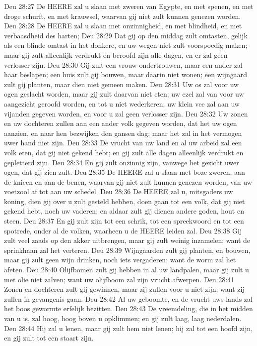 Deu 28:27  De HEERE zal u slaan met zweren van Egypte, en met spenen, en met droge schurft, en met krauwsel, waarvan gij niet zult kunnen genezen worden.
Deu 28:28  De HEERE zal u slaan met onzinnigheid, en met blindheid, en met verbaasdheid des harten;
Deu 28:29  Dat gij op den middag zult omtasten, gelijk als een blinde omtast in het donkere, en uw wegen niet zult voorspoedig maken; maar gij zult alleenlijk verdrukt en beroofd zijn alle dagen, en er zal geen verlosser zijn.
Deu 28:30  Gij zult een vrouw ondertrouwen, maar een ander zal haar beslapen; een huis zult gij bouwen, maar daarin niet wonen; een wijngaard zult gij planten, maar dien niet gemeen maken.
Deu 28:31  Uw os zal voor uw ogen geslacht worden, maar gij zult daarvan niet eten; uw ezel zal van voor uw aangezicht geroofd worden, en tot u niet wederkeren; uw klein vee zal aan uw vijanden gegeven worden, en voor u zal geen verlosser zijn.
Deu 28:32  Uw zonen en uw dochteren zullen aan een ander volk gegeven worden, dat het uw ogen aanzien, en naar hen bezwijken den gansen dag; maar het zal in het vermogen uwer hand niet zijn.
Deu 28:33  De vrucht van uw land en al uw arbeid zal een volk eten, dat gij niet gekend hebt; en gij zult alle dagen alleenlijk verdrukt en gepletterd zijn.
Deu 28:34  En gij zult onzinnig zijn, vanwege het gezicht uwer ogen, dat gij zien zult.
Deu 28:35  De HEERE zal u slaan met boze zweren, aan de knieen en aan de benen, waarvan gij niet zult kunnen genezen worden, van uw voetzool af tot aan uw schedel.
Deu 28:36  De HEERE zal u, mitsgaders uw koning, dien gij over u zult gesteld hebben, doen gaan tot een volk, dat gij niet gekend hebt, noch uw vaderen; en aldaar zult gij dienen andere goden, hout en steen.
Deu 28:37  En gij zult zijn tot een schrik, tot een spreekwoord en tot een spotrede, onder al de volken, waarheen u de HEERE leiden zal.
Deu 28:38  Gij zult veel zaads op den akker uitbrengen, maar gij zult weinig inzamelen; want de sprinkhaan zal het verteren.
Deu 28:39  Wijngaarden zult gij planten, en bouwen, maar gij zult geen wijn drinken, noch iets vergaderen; want de worm zal het afeten.
Deu 28:40  Olijfbomen zult gij hebben in al uw landpalen, maar gij zult u met olie niet zalven; want uw olijfboom zal zijn vrucht afwerpen.
Deu 28:41  Zonen en dochteren zult gij gewinnen, maar zij zullen voor u niet zijn; want zij zullen in gevangenis gaan.
Deu 28:42  Al uw geboomte, en de vrucht uws lands zal het boos gewormte erfelijk bezitten.
Deu 28:43  De vreemdeling, die in het midden van u is, zal hoog, hoog boven u opklimmen; en gij zult laag, laag nederdalen.
Deu 28:44  Hij zal u lenen, maar gij zult hem niet lenen; hij zal tot een hoofd zijn, en gij zult tot een staart zijn.
